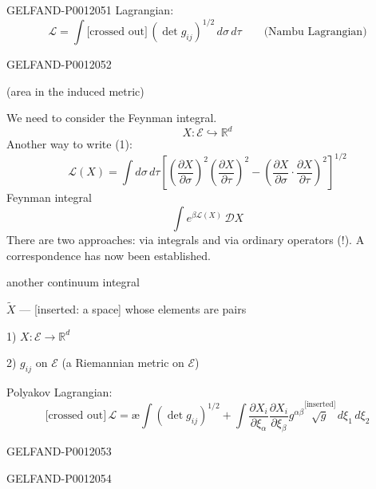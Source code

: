 \begin{GelfandAdjacentEvidence}{GELFAND-P001205}{1}
Lagrangian:
\begin{equation*}
\mathcal L=\int\text{[crossed out]}\,
(\det g_{ij})^{1/2}\,d\sigma\,d\tau
\qquad \text{(Nambu Lagrangian)} \tag{1}
\end{equation*}
\end{GelfandAdjacentEvidence}
\begin{GelfandAdjacentEvidence}{GELFAND-P001205}{2}

(area in the induced metric)

We need to consider the Feynman integral.
\[
X:\mathcal E\hookrightarrow\mathbb R^d
\]
Another way to write (1):
\begin{equation*}
\mathcal L(X)=\int d\sigma\,d\tau
\left[
\left(\frac{\partial X}{\partial\sigma}\right)^2
\left(\frac{\partial X}{\partial\tau}\right)^2
-\left(\frac{\partial X}{\partial\sigma}\cdot
\frac{\partial X}{\partial\tau}\right)^2
\right]^{1/2} \tag{1'}
\end{equation*}
Feynman integral
\begin{equation*}
\int e^{\beta\mathcal L(X)}\,\mathcal D X \tag{2}
\end{equation*}
There are two approaches: via integrals and via ordinary operators (!). A correspondence has now been established.

 another continuum integral

\(\widetilde X\) --- [inserted: a space] whose elements are pairs

1) \(X:\mathcal E\longrightarrow\mathbb R^d\)

2) \(g_{ij}\) on \(\mathcal E\) (a Riemannian metric on \(\mathcal E\))

Polyakov Lagrangian:
\begin{equation*}
\text{[crossed out]}\,
\mathcal L=\text{\ae}\int(\det g_{ij})^{1/2}
+\int\frac{\partial X_i}{\partial\xi_\alpha}
\frac{\partial X_i}{\partial\xi_\beta}g^{\alpha\beta}
\overset{\text{[inserted]}}{\sqrt g}\,d\xi_1\,d\xi_2
\tag{3}
\end{equation*}
\end{GelfandAdjacentEvidence}
\begin{GelfandAdjacentEvidence}{GELFAND-P001205}{3}

\end{GelfandAdjacentEvidence}
\begin{GelfandAdjacentEvidence}{GELFAND-P001205}{4}

\end{GelfandAdjacentEvidence}



